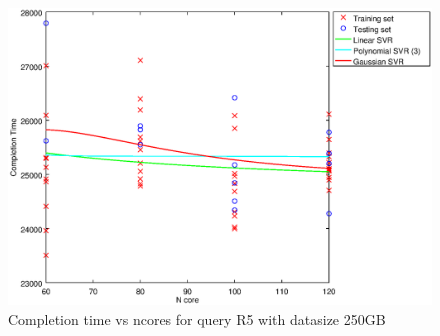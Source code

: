 
\begin {figure}[hbtp]
\centering
\includegraphics[width=\textwidth]{output/R5_250_1_OVER_NCORES/plot_R5_250_bestmodels.eps}
\caption{Completion time vs ncores for query R5 with datasize 250GB}
\label{fig:all_nonlinear_R5_250}
\end {figure}
